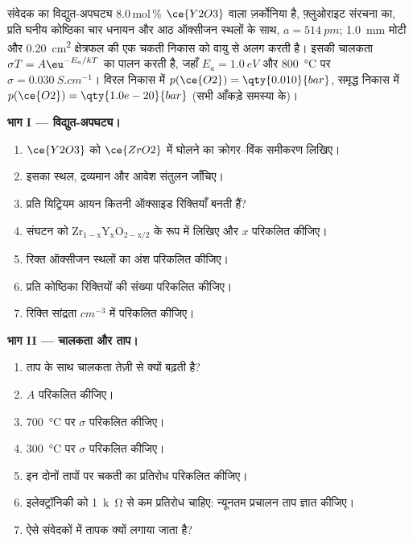 \begin{problem}
\label{pb:b3:solid-state:1}
संवेदक का विद्युत-अपघट्य 8.0\,mol\,\% $\ce{Y2O3}$ वाला ज़र्कोनिया है, फ़्लुओराइट संरचना का,
प्रति घनीय कोष्ठिका चार धनायन और आठ ऑक्सीजन स्थलों के साथ, $a = \qty{514}{pm}$; \qty{1.0}{mm}
मोटी और \qty{0.20}{cm^2} क्षेत्रफल की एक चकती निकास को वायु से अलग करती है। इसकी
चालकता $\sigma T = A\eu^{-E_a/kT}$ का पालन करती है, जहाँ $E_a = \qty{1.0}{eV}$ और \qty{800}{\celsius} पर $\sigma = \qty{0.030}{S.cm^{-1}}$। विरल
निकास में $p(\ce{O2}) = \qty{0.010}{bar}$, समृद्ध निकास में $p(\ce{O2}) = \qty{1.0e-20}{bar}$ (सभी आँकड़े समस्या के)।

\medskip\noindent\textbf{भाग I --- विद्युत-अपघट्य।}
\begin{enumerate}
  \item $\ce{Y2O3}$ को $\ce{ZrO2}$ में घोलने का क्रोगर--विंक समीकरण लिखिए।
  \item इसका स्थल, द्रव्यमान और आवेश संतुलन जाँचिए।
  \item प्रति यिट्रियम आयन कितनी ऑक्साइड रिक्तियाँ बनती हैं?
  \item संघटन को $\mathrm{Zr_{1-x}Y_xO_{2-x/2}}$ के रूप में लिखिए और $x$ परिकलित कीजिए।
  \item रिक्त ऑक्सीजन स्थलों का अंश परिकलित कीजिए।
  \item प्रति कोष्ठिका रिक्तियों की संख्या परिकलित कीजिए।
  \item रिक्ति सांद्रता $\unit{cm^{-3}}$ में परिकलित कीजिए।
\end{enumerate}

\medskip\noindent\textbf{भाग II --- चालकता और ताप।}
\begin{enumerate}[resume]
  \item ताप के साथ चालकता तेज़ी से क्यों बढ़ती है?
  \item $A$ परिकलित कीजिए।
  \item \qty{700}{\celsius} पर $\sigma$ परिकलित कीजिए।
  \item \qty{300}{\celsius} पर $\sigma$ परिकलित कीजिए।
  \item इन दोनों तापों पर चकती का प्रतिरोध परिकलित कीजिए।
  \item इलेक्ट्रॉनिकी को \qty{1}{k\ohm} से कम प्रतिरोध चाहिए: न्यूनतम प्रचालन
        ताप ज्ञात कीजिए।
  \item ऐसे संवेदकों में तापक क्यों लगाया जाता है?
\end{enumerate}


\end{problem}
